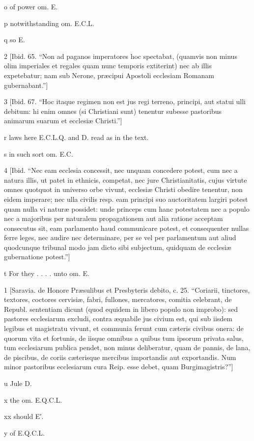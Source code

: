o
of power om. E.

p
notwithstanding om. E.C.L.

q
so E.

2
[Ibid. 65. “Non ad paganos imperatores hoc spectabat, (quamvis non minus olim imperiales et regales quam nunc temporis extiterint) nec ab illis expetebatur; nam sub Nerone, præcipui Apostoli ecclesiam Romanam gubernabant.”]

3
[Ibid. 67. “Hoc itaque regimen non est jus regi terreno, principi, aut statui ulli debitum: hi enim omnes (si Christiani sunt) tenentur subesse pastoribus animarum suarum et ecclesiæ Christi.”]

r
laws here E.C.L.Q. and D. read as in the text.

s
in such sort om. E.C.

4
[Ibid. “Nec eam ecclesia concessit, nec unquam concedere potest, cum nec a natura illis, ut patet in ethnicis, competat, nec jure Christianitatis, cujus virtute omnes quotquot in universo orbe vivunt, ecclesiæ Christi obedire tenentur, non eidem imperare; nec ulla civilis resp. eam principi suo auctoritatem largiri potest quam nulla vi naturæ possidet: unde princeps cum hanc potestatem nec a populo nec a majoribus per naturalem propagationem aut alia ratione acceptam consecutus sit, eam parlamento haud communicare potest, et consequenter nullas ferre leges, nec audire nec determinare, per se vel per parlamentum aut aliud quodcunque tribunal modo jam dicto sibi subjectum, quidquam de ecclesiæ gubernatione potest.”]

t
For they . . . . unto om. E.

1
[Saravia. de Honore Præsulibus et Presbyteris debito, c. 25. “Coriarii, tinctores, textores, coctores cervisiæ, fabri, fullones, mercatores, comitia celebrant, de Republ. sententiam dicunt (quod equidem in libero populo non improbo): sed pastores ecclesiarum excludi, contra æquabile jus civium est, qui sub iisdem legibus et magistratu vivunt, et communia ferunt cum cæteris civibus onera: de quorum vita et fortunis, de iisque omnibus a quibus tum ipsorum privata salus, tum ecclesiarum publica pendet, non minus deliberatur, quam de pannis, de lana, de piscibus, de coriis cæterisque mercibus importandis aut exportandis. Num minor pastoribus ecclesiarum cura Reip. esse debet, quam Burgimagistris?”]

u
Jule D.

x
the om. E.Q.C.L.

xx
should E′.

y
of E.Q.C.L.

